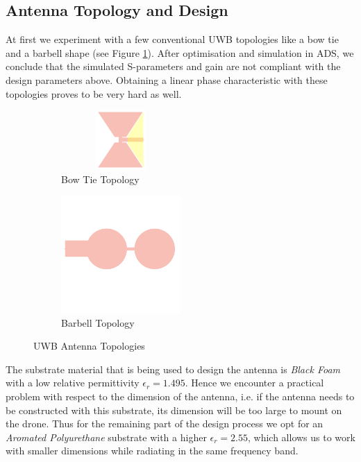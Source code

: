 \documentclass[a4paper]{article}        %
\begin{document}
	\subsection{Antenna Topology and Design}
	\label{subsec:ant_design}

	At first we experiment with a few conventional UWB topologies like a bow tie and a barbell shape (see Figure \ref{fig:topologies}). After optimisation and simulation in ADS, we conclude that the simulated S-parameters and gain are not compliant with the design parameters above. Obtaining a linear phase characteristic with these topologies proves to be very hard as well.  

		\begin{figure}[H]
		\begin{subfigure}{0.5\textwidth}
			\centering
			\includegraphics[width=0.5\textwidth,height=85px]{images/antenna/bow_tie.png}
			\caption{Bow Tie Topology}
		\end{subfigure}
		\begin{subfigure}{0.5\textwidth}
			\centering
			\includegraphics[width=0.5\textwidth]{images/antenna/bar_bell.png}
			\caption{Barbell Topology}
		\end{subfigure}
		\caption{UWB Antenna Topologies}
		\label{fig:topologies}
		\end{figure} 

	The substrate material that is being used to design the antenna is \textit{Black Foam} with a low relative permittivity $\epsilon_r = 1.495$. Hence we encounter a practical problem with respect to the dimension of the antenna, i.e. if the antenna needs to be constructed with this substrate, its dimension will be too large to mount on the drone. Thus for the remaining part of the design process we opt for an \textit{Aromated Polyurethane} substrate with a higher $\epsilon_r = 2.55$, which allows us to work with smaller dimensions while radiating in the same frequency band. 
\end{document}
